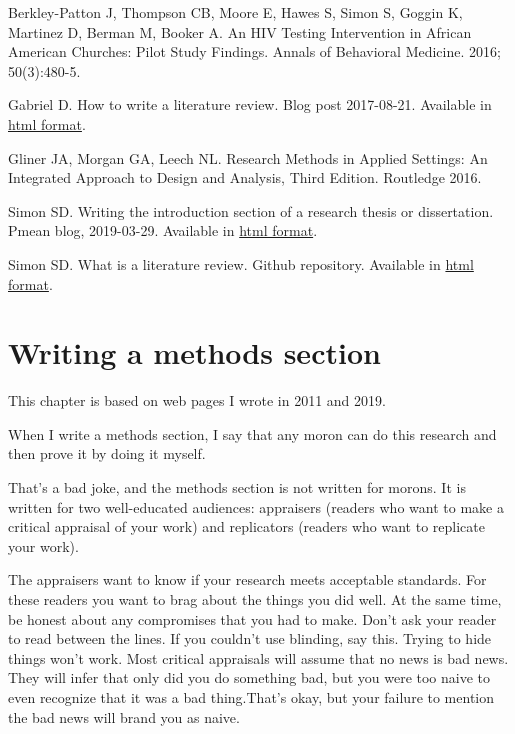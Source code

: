 \documentclass[
  letterpaper,
  DIV=11,
  numbers=noendperiod]{scrreprt}
\begin{document}
\begin{tcolorbox}
Berkley-Patton J, Thompson CB, Moore E, Hawes S, Simon S, Goggin K,
Martinez D, Berman M, Booker A. An HIV Testing Intervention in African
American Churches: Pilot Study Findings. Annals of Behavioral Medicine.
2016; 50(3):480-5.

Gabriel D. How to write a literature review. Blog post 2017-08-21.
Available in
\href{https://deborahgabriel.com/2017/08/21/how-to-write-a-literature-review/}{html
format}.

Gliner JA, Morgan GA, Leech NL. Research Methods in Applied Settings: An
Integrated Approach to Design and Analysis, Third Edition. Routledge
2016.

Simon SD. Writing the introduction section of a research thesis or
dissertation. Pmean blog, 2019-03-29. Available in
\href{http://pmean.com/posts/introduction-section/}{html format}.

Simon SD. What is a literature review. Github repository. Available in
\href{https://github.com/pmean/classes/blob/master/clinical-research-methodology/03/results/simon-5510-03-slides.html}{html
format}.


\chapter{Writing a methods section}\label{writing-a-methods-section}

This chapter is based on web pages I wrote in 2011 and 2019.

When I write a methods section, I say that any moron can do this
research and then prove it by doing it myself.

That's a bad joke, and the methods section is not written for morons. It
is written for two well-educated audiences: appraisers (readers who want
to make a critical appraisal of your work) and replicators (readers who
want to replicate your work).

The appraisers want to know if your research meets acceptable standards.
For these readers you want to brag about the things you did well. At the
same time, be honest about any compromises that you had to make. Don't
ask your reader to read between the lines. If you couldn't use blinding,
say this. Trying to hide things won't work. Most critical appraisals
will assume that no news is bad news. They will infer that only did you
do something bad, but you were too naive to even recognize that it was a
bad thing.That's okay, but your failure to mention the bad news will
brand you as naive.


\end{tcolorbox}
\end{document}
